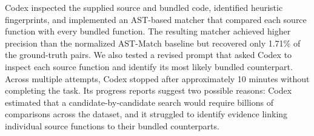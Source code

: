 Codex inspected the supplied source and bundled code, identified heuristic fingerprints, and implemented an AST-based matcher that compared each source function with every bundled function. The resulting matcher achieved higher precision than the normalized AST-Match baseline but recovered only 1.71\% of the ground-truth pairs. We also tested a revised prompt that asked Codex to inspect each source function and identify its most likely bundled counterpart. Across multiple attempts, Codex stopped after approximately 10 minutes without completing the task. Its progress reports suggest two possible reasons: Codex estimated that a candidate-by-candidate search would require billions of comparisons across the dataset, and it struggled to identify evidence linking individual source functions to their bundled counterparts.

\par\medskip
\noindent{}
\par\medskip



